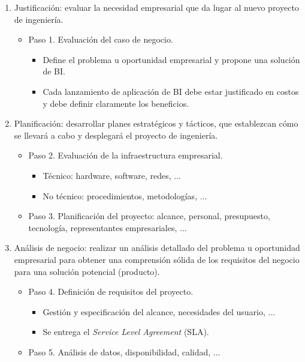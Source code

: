 \begin{minipage}{0.6\textwidth}
\begin{enumerate}
\item Justificación: evaluar la necesidad empresarial que da lugar al nuevo proyecto de ingeniería.
\begin{itemize}
\item Paso 1. Evaluación del caso de negocio.
\begin{itemize}
\item Define el problema u oportunidad empresarial y propone una solución de BI.
\item Cada lanzamiento de aplicación de BI debe estar justificado en costos y debe definir claramente los beneficios.
\end{itemize}
\end{itemize}
\item Planificación: desarrollar planes estratégicos y tácticos, que establezcan cómo se llevará a cabo y desplegará el proyecto de ingeniería.
\begin{itemize}
\item Paso 2. Evaluación de la infraestructura empresarial.
\begin{itemize}
\item Técnico: hardware, software, redes, ... 
\item No técnico: procedimientos, metodologías, ...
\end{itemize}
\item Paso 3. Planificación del proyecto: alcance, personal, presupuesto, tecnología, representantes empresariales, ...
\end{itemize}
\item Análisis de negocio: realizar un análisis detallado del problema u oportunidad empresarial para obtener una comprensión sólida de los requisitos del negocio para una solución potencial (producto).
\begin{itemize}
\item Paso 4. Definición de requisitos del proyecto.
\begin{itemize}
\item Gestión y especificación del alcance, necesidades del usuario, ...
\item Se entrega el \textit{Service Level Agreement} (SLA).
\end{itemize}
\item Paso 5. Análisis de datos, disponibilidad, calidad, ...
\end{itemize}
\end{enumerate}
\end{minipage}

